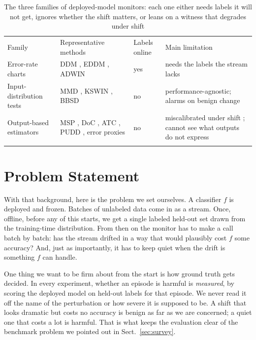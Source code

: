\documentclass[graybox]{SNmult}
\begin{document}
\begin{table}[!t]
\caption{The three families of deployed-model monitors: each one either
needs labels it will not get, ignores whether the shift matters, or
leans on a witness that degrades under shift}
\label{tab:families}
\begin{tabular}{p{2.9cm}p{3.4cm}p{1.5cm}p{3.4cm}}
\hline\noalign{\smallskip}
Family & Representative methods & Labels online & Main limitation \\
\noalign{\smallskip}\svhline\noalign{\smallskip}
Error-rate charts & DDM \cite{gama2004learning}, EDDM \cite{baena2006eddm}, ADWIN \cite{bifet2007adwin} & yes & needs the labels the stream lacks \\
\noalign{\smallskip}
Input-distribution tests & MMD \cite{gretton2012kernel}, KSWIN \cite{raab2020kswin}, BBSD \cite{rabanser2019failing} & no & performance-agnostic; alarms on benign change \\
\noalign{\smallskip}
Output-based estimators & MSP \cite{hendrycks2017baseline}, DoC \cite{guillory2021doc}, ATC \cite{garg2022atc}, PUDD \cite{pudd2025}, error proxies \cite{amoukou2024sequential} & no & miscalibrated under shift \cite{ovadia2019trust}; cannot see what outputs do not express \\
\noalign{\smallskip}\hline\noalign{\smallskip}
\end{tabular}
\end{table}

\section{Problem Statement}
\label{sec:problem}

With that background, here is the problem we set ourselves. A classifier
$f$ is deployed and frozen. Batches of unlabeled data come in as a
stream. Once, offline, before any of this starts, we get a single
labeled held-out set drawn from the training-time distribution. From
then on the monitor has to make a call batch by batch: has the stream
drifted in a way that would plausibly cost $f$ some accuracy? And, just
as importantly, it has to keep quiet when the drift is something $f$ can
handle.

One thing we want to be firm about from the start is how ground truth
gets decided. In every experiment, whether an episode is harmful is
\emph{measured}, by scoring the deployed model on held-out labels for
that episode. We never read it off the name of the perturbation or how
severe it is supposed to be. A shift that looks dramatic but costs no
accuracy is benign as far as we are concerned; a quiet one that costs a
lot is harmful. That is what keeps the evaluation clear of the benchmark
problem we pointed out in Sect.~\ref{sec:survey}.
\end{document}
